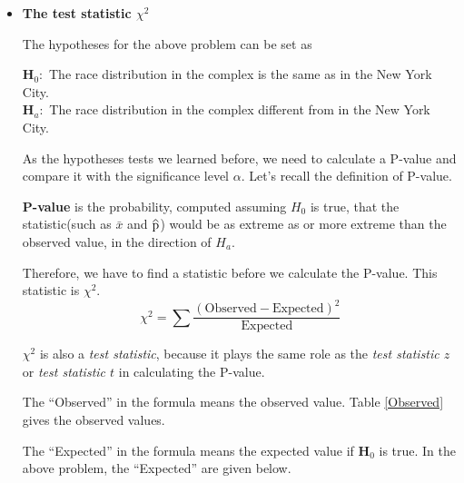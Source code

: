 \documentclass[a4paper, 12pt,twoside]{book}
\newcommand\reallywidehat[1]{%
\savestack{\tmpbox}{\stretchto{%
  \scaleto{%
    \scalerel*[\widthof{\ensuremath{#1}}]{\kern-.6pt\bigwedge\kern-.6pt}%
    {\rule[-\textheight/2]{1ex}{\textheight}}%
  }{\textheight}%
}{0.5ex}}%
\stackon[1pt]{#1}{\tmpbox}%
}
\begin{document}
\begin{itemize}
   \item \textbf{The test statistic $\chi^2$}\vspace{0.3cm}

  The hypotheses for the above problem can be set as\vspace{0.3cm}
  
  $\textbf{H}_0:$ The race distribution in the complex is the same as in the New York City.\\
   $\textbf{H}_a:$ The race distribution in the complex different from in the New York City.\vspace{0.3cm}

As the hypotheses tests we learned before, we need to calculate a P-value and compare it with the significance level $\alpha$. Let's recall the definition of P-value.\vspace{0.3cm}

\colorbox{babypink}{\parbox{0.9\textwidth}{
\textbf{P-value} is the probability, computed assuming $H_0$ is true, that the statistic(such as $\bar{x}$ and $\reallywidehat{p}$) would be as extreme as or more extreme than the observed value, in the direction of $H_a$.
}}
\vspace{0.3cm}

Therefore, we have to find a  statistic before we calculate the P-value. This statistic is $\chi^2$.
$$\chi^2 = \sum\frac{(\text{Observed}- \text{Expected})^2}{\text{Expected}}$$

$\chi^2$ is also a \textit{test statistic}, because it plays the same role as the \textit{test statistic $z$} or \textit{test statistic $t$} in calculating the P-value.\vspace{0.3cm}

The ``Observed'' in the formula means the observed value. Table \ref{Observed} gives the observed values.\vspace{0.3cm}

The ``Expected'' in the formula means the expected value if $\textbf{H}_0$ is true. In the above problem, the ``Expected'' are given below. 
    \begin{table}[H]
    \caption{Expected number of residents of different races}
    \label{Expected}
    \end{table} 


\end{itemize}
\end{document}
